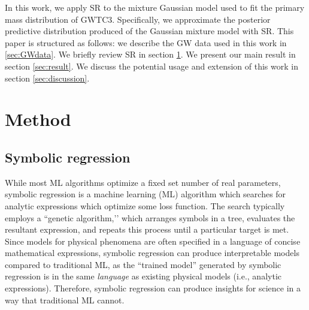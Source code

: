 \documentclass[nohyperref]{article}
\theoremstyle{plain}
\theoremstyle{definition}
\theoremstyle{remark}
\begin{document}
In this work, we apply SR to the mixture Gaussian model used to fit the primary mass distribution of GWTC3.
Specifically, we approximate the posterior predictive distribution produced of the Gaussian mixture model with SR.
This paper is structured as follows: we describe the GW data used in this work in \ref{sec:GWdata}.
We briefly review SR in section \ref{sec:method}.
We present our main result in section \ref{sec:result}.
We discuss the potential usage and extension of this work in section \ref{sec:discussion}.

\section{Method}
\label{sec:method}

\subsection{Symbolic regression}

While most ML algorithms optimize a fixed set number of real parameters,
symbolic regression is a machine learning (ML) algorithm which searches for analytic expressions which optimize some loss function.
The search typically employs a ``genetic algorithm,’’ which arranges symbols in a tree, evaluates the resultant expression, and repeats this process until a particular target is met.
Since models for physical phenomena are often specified in a language of concise mathematical expressions, symbolic regression can produce interpretable models compared to traditional ML, as the ``trained model'' generated by symbolic regression is in the same \textit{language} as existing physical models (i.e., analytic expressions).
Therefore, symbolic regression can produce insights for science in a way that traditional ML cannot.
\end{document}

